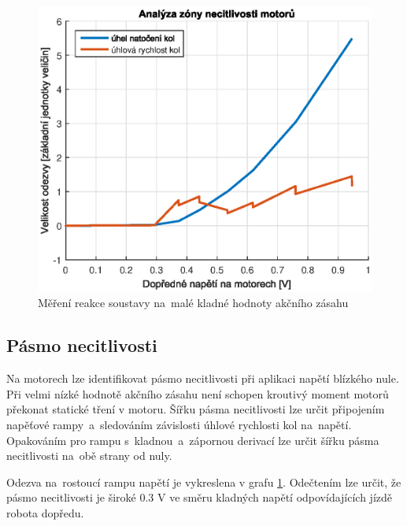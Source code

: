 \documentclass[conference]{IEEEtran}
\begin{document}
\begin{figure}[htbp]
    \centerline{\includegraphics[width=\linewidth]{deadzone_motory_vpred.eps}}
    \caption{Měření reakce soustavy na~malé kladné hodnoty akčního zásahu}
    \label{fig:deadzone_vpred}        
\end{figure}

\subsection{Pásmo necitlivosti}
Na motorech lze identifikovat pásmo necitlivosti při aplikaci napětí blízkého nule. Při velmi nízké hodnotě
akčního zásahu není schopen kroutivý moment motorů překonat statické tření v motoru.
Šířku pásma necitlivosti lze určit připojením napěťové rampy~a~sledováním závislosti úhlové rychlosti kol na~napětí.
Opakováním pro rampu s~kladnou~a~zápornou derivací lze určit šířku pásma necitlivosti na~obě strany od nuly.

Odezva na~rostoucí rampu napětí je vykreslena v grafu \ref{fig:deadzone_vpred}. Odečtením lze určit,
že pásmo necitlivosti je široké 0.3 \si{V} ve směru kladných napětí odpovídajících jízdě robota dopředu. 
\end{document}
